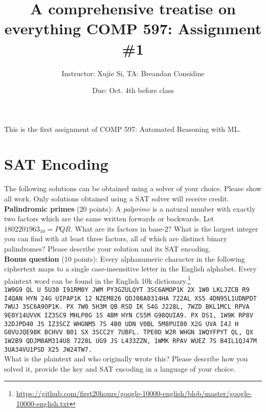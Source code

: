 \documentclass[11pt]{article}
\author{Instructor: Xujie Si, TA: Breandan Considine}
\date{Due: Oct. 4th before class}
\title{A comprehensive treatise on everything\vspace{-2ex}%
}
\title{COMP 597: Assignment \#1}
\begin{document}
    \maketitle
    \noindent This is the first assignment of COMP 597: Automated Reasoning with ML.


    \section{SAT Encoding}

    The following solutions can be obtained using a solver of your choice. Please show all work. Only solutions obtained using a SAT solver will receive credit.\\

    \noindent \textbf{Palindromic primes} (20 points): A \textit{palprime} is a natural number with exactly two factors which are the same written forwards or backwards. Let $1802201963_{10} = PQR$. What are its factors in base-2? What is the largest integer you can find with at least three factors, all of which are distinct binary palindromes? Please describe your solution and its SAT encoding.\\

    \noindent \textbf{Bonus question} (10 points): Every alphanumeric character in the following ciphertext maps to a single case-insensitive letter in the English alphabet. Every plaintext word can be found in the English 10k dictionary.\footnote{\url{https://github.com/first20hours/google-10000-english/blob/master/google-10000-english.txt}}\\

    \noindent \tiny\texttt{1W9G9 QL U 5U30 I91RM0Y JWM PY3GZULQYT 3SC6AMOP1K 2X 1W0 LKLJZCB R9 I4QAN HYN 24G UIPAP1K 12 NZEM826 QDJ08A0314HA 722AL XS5 4DN95L1UDNPDT 7WUJ 3SC6A9OP1K. PX 7W0 5H3M QB RSD IK S4G J228L, 7WZD BKL1MCL RPVA 9E0Y14UVVK IZ3SC9 MHLP0G 1S 4BM HYN CS5M G98QUIA9. PX DS1, 1W9K RP8V 32DJPD40 JS IZ3SCZ WHGNM5 7S 4B0 UDN V0BL 5M8PUI80 X2G UVA I4J H G0VUJQE98K BCHVV B01 SX 3SCC2Y 7UBFL. TPE0D W2R WHGN 1WQYFPYT QL, QX 1W2B9 QDJM8AM314U8 7228L UG9 JS L433ZZN, 1WMK RPAV WUEZ 7S B4IL1QJ47M 3UA34VU1PSD X25 JW24TW7.}\normalsize\\

    \noindent What is the plaintext and who originally wrote this? Please describe how you solved it, provide the key and SAT encoding in a language of your choice.
\end{document}
